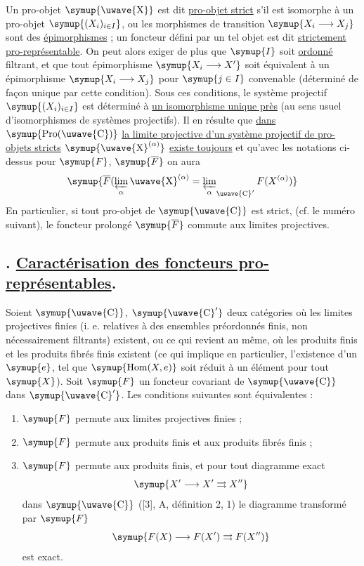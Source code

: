 Un pro-objet $\symup{\text{\uwave{X}}}$ est dit \uline{pro-objet strict} s'il est isomorphe
à un pro-objet $\symup{(X_i)_{i\in I}}$, ou les morphismes de transition
$\symup{X_i\longrightarrow X_j}$ sont des \uline{épimorphismes} ; un foncteur défini par un
tel objet est dit \uline{strictement pro-représentable}. On peut alors exiger de
plus que $\symup{I}$ soit \uline{ordonné} filtrant, et que tout épimorphisme
$\symup{X_i\longrightarrow X'}$ soit équivalent à un épimorphisme
$\symup{X_i\longrightarrow X_j}$ pour $\symup{j\in I}$ convenable (déterminé de façon unique
par cette condition). Sous ces conditions, le système projectif
$\symup{(X_i)_{i\in I}}$ est déterminé à \uline{un isomorphisme unique près} (au sens usuel
d'isomorphismes de systèmes projectifs). Il en résulte que \uline{dans}
$\symup{\operatorname{Pro}(\text{\uwave{C}})}$ \uline{la limite projective d'un système projectif de pro-objets stricts} $\symup{\text{\uwave{X}}^{(\alpha)}}$ \uline{existe toujours} et qu'avec les
notations ci-dessus pour $\symup{F}$, $\symup{\overline F}$ on aura
\[
  \symup{\overline F(\varprojlim\limits_\alpha\text{\uwave{X}}^{(\alpha)}
  =\mathop{\underset{\alpha}{\varprojlim}}\nolimits_{\text{\uwave{C}}'}
  F(X^{(\alpha)})}
\]
En particulier, si tout pro-objet de $\symup{\text{\uwave{C}}}$ est strict, (cf. le numéro
suivant), le foncteur prolongé $\symup{\overline F}$ commute aux limites projectives.

\subsection*{. \uline{Caractérisation des foncteurs pro-représentables}.}

Soient $\symup{\text{\uwave{C}}}$, $\symup{\text{\uwave{C}}'}$ deux catégories où les limites projectives
finies (i. e. relatives à des ensembles préordonnés finis, non nécessairement
filtrants) existent, ou ce qui revient au même, où les produits finis et les
produits fibrés finis existent (ce qui implique en particulier, l'existence
d'un  $\symup{e}$, tel que $\symup{\operatorname{Hom}(X,e)}$ soit
réduit à un élément pour tout $\symup{X}$). Soit $\symup{F}$ un foncteur covariant de
$\symup{\text{\uwave{C}}}$ dans $\symup{\text{\uwave{C}}'}$. Les conditions suivantes sont équivalentes :

\begin{enumerate}
\item[i.] $\symup{F}$ permute aux limites projectives finies ;
\item[ii.] $\symup{F}$ permute aux produits finis et aux produits fibrés finis ;
\item[iii.] $\symup{F}$ permute aux produits finis, et pour tout diagramme exact
\[
  \symup{X'\longrightarrow X'\rightrightarrows X''}
\]
dans $\symup{\text{\uwave{C}}}$ ([3], A, définition 2, 1) le diagramme transformé par $\symup{F}$
\[
  \symup{F(X)\longrightarrow F(X')\rightrightarrows F(X'')}
\]
est exact.
\end{enumerate}

